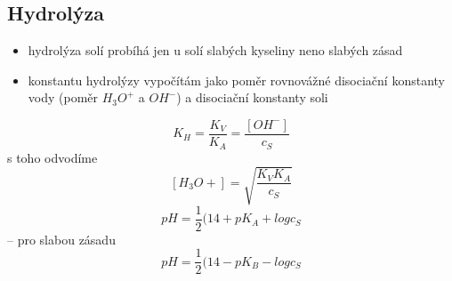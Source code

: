 \documentclass{article}
\begin{document}
\subsection{Hydrolýza}
\begin{itemize}
    \item hydrolýza solí probíhá jen u solí slabých kyseliny neno slabých zásad
    \item konstantu hydrolýzy vypočítám jako poměr rovnovážné disociační konstanty vody (poměr $H_3O^+$ a $OH^-$) a disociační konstanty soli
\end{itemize}
    $$K_H = \frac{K_V}{K_A} = \frac{[OH^-]}{c_S}$$
    s toho odvodíme
    $$[H_3O+]=\sqrt{\frac{K_V K_A}{c_S}}$$
    $$pH = \frac{1}{2}(14+pK_A + log c_S$$ -- pro slabou zásadu
    $$pH = \frac{1}{2}(14-pK_B-log c_S$$
\end{document}
